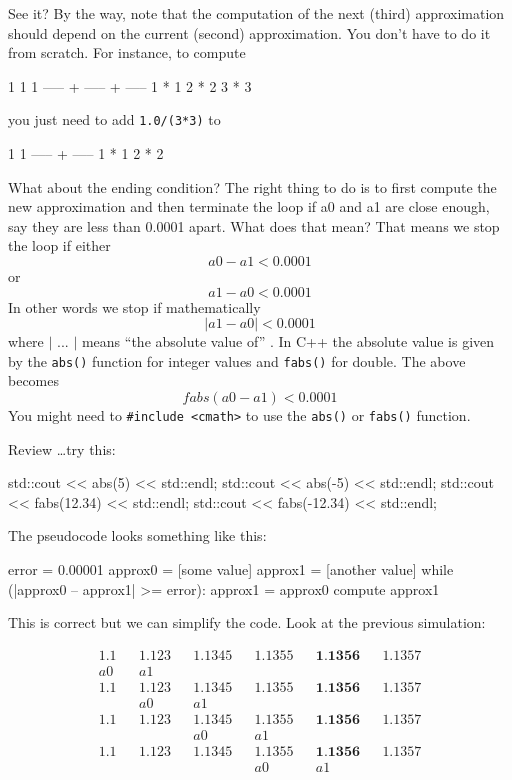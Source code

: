 See it? By the way, note that the computation of the next (third)
approximation should depend on the current (second) approximation. You
don't have to do it from scratch. For instance, to
compute
\begin{console}
  1       1       1
----- + ----- + -----
1 * 1   2 * 2   3 * 3
\end{console}
you just need to add \texttt{1.0/(3*3)} to
\begin{console}
  1       1
----- + -----
1 * 1   2 * 2
\end{console}
What about the ending condition? The right thing to do is to first
compute the new approximation and then terminate the loop if a0 and a1
are close enough, say they are less than 0.0001 apart. What does that
mean? That means we stop the loop if either
\[a0 - a1 < 0.0001\]
or
\[a1 - a0 < 0.0001\]
In other words we stop if mathematically
\[
| a1 - a0 | < 0.0001
\]
where $|$ ... $|$ means ``the absolute value of'' . In C++ the absolute value is given by the \texttt{abs()} function for integer values and \texttt{fabs()} for double. The above becomes
\[
fabs(a0 - a1) < 0.0001
\]
You might need to \texttt{\#include <cmath>} to use the \texttt{abs()} or \texttt{fabs()} function.

\begin{ex} Review \ldots try this:
\begin{console}
std::cout << abs(5) << std::endl;
std::cout << abs(-5) << std::endl;
std::cout << fabs(12.34) << std::endl;
std::cout << fabs(-12.34) << std::endl; 
\end{console}

The pseudocode looks something like this:
\begin{console}
error = 0.00001
approx0 = [some value]
approx1 = [another value]
while (|approx0 -- approx1| >= error):
      approx1 = approx0
      compute approx1 
\end{console}
\end{ex}
This is correct but we can simplify the code. Look at the previous
simulation:

\begin{align*}
1.1         &&1.123       &&1.1345      &&1.1355      &&\textbf{1.1356} &&1.1357 \\
a0         &&a1 \\
1.1         &&1.123       &&1.1345      &&1.1355      &&\textbf{1.1356} &&1.1357 \\
&&a0        &&a1 \\
1.1         &&1.123       &&1.1345      &&1.1355      &&\textbf{1.1356} &&1.1357 \\
&&&&a0       &&a1 \\
1.1         &&1.123       &&1.1345      &&1.1355      &&\textbf{1.1356} &&1.1357 \\
&&&&&&a0      &&a1 \\
\end{align*}

